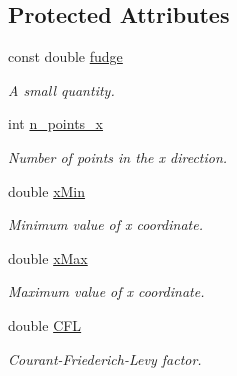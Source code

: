 \subsection*{Protected Attributes}
\begin{DoxyCompactItemize}
\item 
\mbox{\label{classSimulation_a33c150f15bbe3345522eba79bd1e8f33}} 
const double \hyperlink{classSimulation_a33c150f15bbe3345522eba79bd1e8f33}{fudge}
\begin{DoxyCompactList}\small\item\em A small quantity. \end{DoxyCompactList}\item 
\mbox{\label{classSimulation_a92fd8cd6f62935dd3915e6a1dd6eb4ac}} 
int \hyperlink{classSimulation_a92fd8cd6f62935dd3915e6a1dd6eb4ac}{n\+\_\+points\+\_\+x}
\begin{DoxyCompactList}\small\item\em Number of points in the x direction. \end{DoxyCompactList}\item 
\mbox{\label{classSimulation_a67fda8e9da3b2bbc39545dfc4afa9873}} 
double \hyperlink{classSimulation_a67fda8e9da3b2bbc39545dfc4afa9873}{x\+Min}
\begin{DoxyCompactList}\small\item\em Minimum value of x coordinate. \end{DoxyCompactList}\item 
\mbox{\label{classSimulation_a3c748d2b081bc1c979cc974f420e90ea}} 
double \hyperlink{classSimulation_a3c748d2b081bc1c979cc974f420e90ea}{x\+Max}
\begin{DoxyCompactList}\small\item\em Maximum value of x coordinate. \end{DoxyCompactList}\item 
\mbox{\label{classSimulation_a6af2df81dac27c93eb75b29c92855049}} 
double \hyperlink{classSimulation_a6af2df81dac27c93eb75b29c92855049}{C\+FL}
\begin{DoxyCompactList}\small\item\em Courant-\/\+Friederich-\/\+Levy factor. \end{DoxyCompactList}\item 

\end{DoxyCompactItemize}
